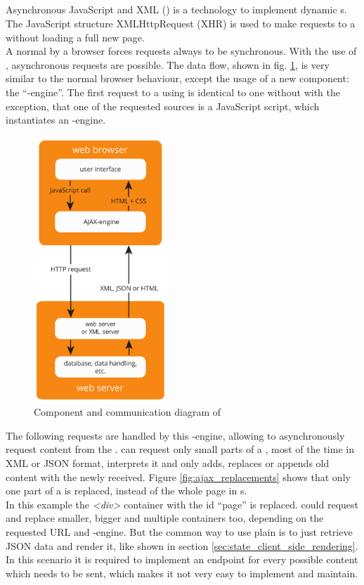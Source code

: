 \subsection{\ajax{}\label{ajax}}
Asynchronous JavaScript and XML (\ajax{}) is a technology to implement dynamic \webPage{}s.
The JavaScript structure XMLHttpRequest (XHR) is used to make requests to a \webServer{} without loading a full new page.
\\
A normal \httpRequest{} by a browser forces requests always to be synchronous.
With the use of \ajax{}, asynchronous requests are possible.
The data flow, shown in fig. \ref{fig:ajax_components}, is very similar to the normal browser behaviour, except the usage of a new component: the \enquote{\ajax{}-engine}.
The first request to a \webServer{} using \ajax{} is identical to one without \ajax{} with the exception, that one of the requested sources is a JavaScript script, which instantiates an \ajax{}-engine.

\begin{figure}[H]
\centering 
\includegraphics[height=10cm]{images/ajax.pdf}
\caption[ajax_components]{Component and communication diagram of \ajax{}}
\label{fig:ajax_components}
\end{figure}

\noindent{}The following requests are handled by this \ajax{}-engine, allowing to asynchronously request content from the \webServer{}.
\ajax{} can request only small parts of a \webSite{}, most of the time in XML or JSON format, interprets it and only adds, replaces or appends old content with the newly received.
Figure \ref{fig:ajax_replacements} shows that only one part of a \webPage{} is replaced, instead of the whole page in \httpRequest{}s.
\\
In this example the \emph{<div>} container with the id \enquote{page} is replaced.
\ajax{} could request and replace smaller, bigger and multiple containers too, depending on the requested URL and \ajax{}-engine.
But the common way to use plain \ajax{} is to just retrieve JSON data and render it, like shown in section \ref{sec:state_client_side_rendering}.
In this scenario it is required to implement an endpoint for every possible content which needs to be sent, which makes it not very easy to implement and maintain.

